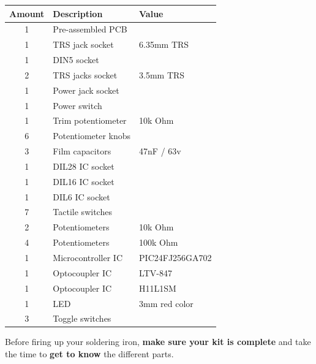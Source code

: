\documentclass{scrartcl}
\begin{document}
\begin{center}
    \begin{tabular}{|c|l|l|}
        \hline
        \textbf{Amount} & \textbf{Description} & \textbf{Value}  \\
        \hline
        1               & Pre-assembled PCB    &                 \\
        1               & TRS jack socket      & 6.35mm TRS      \\
        1               & DIN5 socket          &                 \\
        2               & TRS jacks socket     & 3.5mm TRS       \\
        1               & Power jack socket    &                 \\
        1               & Power switch         &                 \\
        1               & Trim potentiometer   & 10k Ohm         \\
        6               & Potentiometer knobs  &                 \\
        3               & Film capacitors      & 47nF / 63v      \\
        1               & DIL28 IC socket      &                 \\
        1               & DIL16 IC socket      &                 \\
        1               & DIL6 IC socket       &                 \\
        7               & Tactile switches     &                 \\
        2               & Potentiometers       & 10k Ohm         \\
        4               & Potentiometers       & 100k Ohm        \\
        1               & Microcontroller IC   & PIC24FJ256GA702 \\
        1               & Optocoupler IC       & LTV-847         \\
        1               & Optocoupler IC       & H11L1SM         \\
        1               & LED                  & 3mm red color   \\
        3               & Toggle switches      &                 \\
        \hline
    \end{tabular}
\end{center}

\vspace{0.25cm}
Before firing up your soldering iron, \textbf{make sure your kit is complete} and take the time to \textbf{get to know} the different parts.
\end{document}
